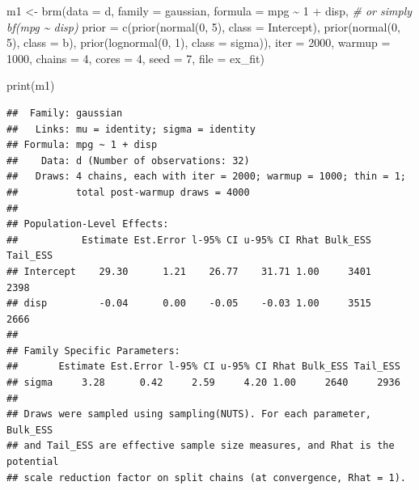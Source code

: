 \documentclass[
]{book}
\newenvironment{Shaded}{\begin{snugshade}}{\end{snugshade}}
\newcommand{\AttributeTok}[1]{\textcolor[rgb]{0.77,0.63,0.00}{#1}}
\newcommand{\CommentTok}[1]{\textcolor[rgb]{0.56,0.35,0.01}{\textit{#1}}}
\newcommand{\DecValTok}[1]{\textcolor[rgb]{0.00,0.00,0.81}{#1}}
\newcommand{\FunctionTok}[1]{\textcolor[rgb]{0.00,0.00,0.00}{#1}}
\newcommand{\NormalTok}[1]{#1}
\newcommand{\OtherTok}[1]{\textcolor[rgb]{0.56,0.35,0.01}{#1}}
\newcommand{\SpecialCharTok}[1]{\textcolor[rgb]{0.00,0.00,0.00}{#1}}
\newcommand{\StringTok}[1]{\textcolor[rgb]{0.31,0.60,0.02}{#1}}
\begin{document}
\begin{Shaded}
\begin{Highlighting}[]
\NormalTok{m1 }\OtherTok{\textless{}{-}} \FunctionTok{brm}\NormalTok{(}\AttributeTok{data =}\NormalTok{ d, }
    \AttributeTok{family =}\NormalTok{ gaussian,}
    \AttributeTok{formula =}\NormalTok{ mpg }\SpecialCharTok{\textasciitilde{}} \DecValTok{1} \SpecialCharTok{+}\NormalTok{ disp, }\CommentTok{\# or simply bf(mpg \textasciitilde{} disp)}
    \AttributeTok{prior =} \FunctionTok{c}\NormalTok{(}\FunctionTok{prior}\NormalTok{(}\FunctionTok{normal}\NormalTok{(}\DecValTok{0}\NormalTok{, }\DecValTok{5}\NormalTok{), }\AttributeTok{class =}\NormalTok{ Intercept),}
              \FunctionTok{prior}\NormalTok{(}\FunctionTok{normal}\NormalTok{(}\DecValTok{0}\NormalTok{, }\DecValTok{5}\NormalTok{), }\AttributeTok{class =}\NormalTok{ b),}
              \FunctionTok{prior}\NormalTok{(}\FunctionTok{lognormal}\NormalTok{(}\DecValTok{0}\NormalTok{, }\DecValTok{1}\NormalTok{), }\AttributeTok{class =}\NormalTok{ sigma)),}
    \AttributeTok{iter =} \DecValTok{2000}\NormalTok{, }\AttributeTok{warmup =} \DecValTok{1000}\NormalTok{, }\AttributeTok{chains =} \DecValTok{4}\NormalTok{, }\AttributeTok{cores =} \DecValTok{4}\NormalTok{,}
    \AttributeTok{seed =} \DecValTok{7}\NormalTok{,}
    \AttributeTok{file =} \StringTok{\textquotesingle{}ex\_fit\textquotesingle{}}\NormalTok{)}

\FunctionTok{print}\NormalTok{(m1)}
\end{Highlighting}
\end{Shaded}

\begin{verbatim}
##  Family: gaussian 
##   Links: mu = identity; sigma = identity 
## Formula: mpg ~ 1 + disp 
##    Data: d (Number of observations: 32) 
##   Draws: 4 chains, each with iter = 2000; warmup = 1000; thin = 1;
##          total post-warmup draws = 4000
## 
## Population-Level Effects: 
##           Estimate Est.Error l-95% CI u-95% CI Rhat Bulk_ESS Tail_ESS
## Intercept    29.30      1.21    26.77    31.71 1.00     3401     2398
## disp         -0.04      0.00    -0.05    -0.03 1.00     3515     2666
## 
## Family Specific Parameters: 
##       Estimate Est.Error l-95% CI u-95% CI Rhat Bulk_ESS Tail_ESS
## sigma     3.28      0.42     2.59     4.20 1.00     2640     2936
## 
## Draws were sampled using sampling(NUTS). For each parameter, Bulk_ESS
## and Tail_ESS are effective sample size measures, and Rhat is the potential
## scale reduction factor on split chains (at convergence, Rhat = 1).
\end{verbatim}
\end{document}
